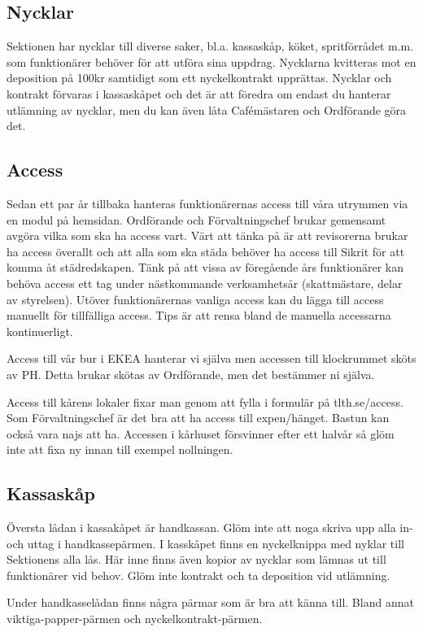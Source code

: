 \documentclass[10pt]{article}
\begin{document}
\subsection{Nycklar}
Sektionen har nycklar till diverse saker, bl.a. kassaskåp, köket, spritförrådet m.m. som funktionärer behöver för att utföra sina uppdrag. Nycklarna kvitteras mot en deposition på 100kr samtidigt som ett nyckelkontrakt upprättas. Nycklar och kontrakt förvaras i kassaskåpet och det är att föredra om endast du hanterar utlämning av nycklar, men du kan även låta Cafémästaren och Ordförande göra det.

\subsection{Access}
Sedan ett par år tillbaka hanteras funktionärernas access till våra utrymmen via en modul på hemsidan. Ordförande och Förvaltningschef brukar gemensamt avgöra vilka som ska ha access vart. Värt att tänka på är att revisorerna brukar ha access överallt och att alla som ska städa behöver ha access till Sikrit för att komma åt städredskapen. Tänk på att vissa av föregående års funktionärer kan behöva access ett tag under nästkommande verksamhetsår (skattmästare, delar av styrelsen). Utöver funktionärernas vanliga access kan du lägga till access manuellt för tillfälliga access. Tips är att rensa bland de manuella accessarna kontinuerligt.

Access till vår bur i EKEA hanterar vi själva men accessen till klockrummet sköts av PH. Detta brukar skötas av Ordförande, men det bestämmer ni själva.

Access till kårens lokaler fixar man genom att fylla i formulär på tlth.se/access. Som Förvaltningschef är det bra att ha access till expen/hänget. Bastun kan också vara najs att ha. Accessen i kårhuset försvinner efter ett halvår så glöm inte att fixa ny innan till exempel nollningen.

\subsection{Kassaskåp}
Översta lådan i kassakåpet är handkassan. Glöm inte att noga skriva upp alla in- och uttag i handkassepärmen. I kasskåpet finns en nyckelknippa med nyklar till Sektionens alla lås. Här inne finns även kopior av nycklar som lämnas ut till funktionärer vid behov. Glöm inte kontrakt och ta deposition vid utlämning.

Under handkasselådan finns några pärmar som är bra att känna till. Bland annat viktiga-papper-pärmen och nyckelkontrakt-pärmen.
\end{document}
